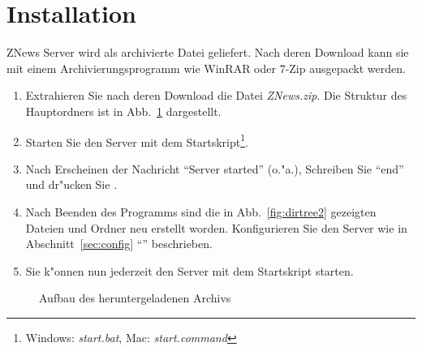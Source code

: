 \documentclass[12pt]{article}
\providecommand\meta[1]{\textlangle{\itshape #1\/}\textrangle}
\begin{document}
\begin{titlepage}

        \vfill

    \end{titlepage}



    \newpage
    \tableofcontents
    \newpage

    \section{Installation}

    ZNews Server wird als archivierte Datei geliefert.
    Nach deren Download kann sie mit einem Archivierungsprogramm
    wie WinRAR oder 7-Zip ausgepackt werden.

    \begin{enumerate}
        \item Extrahieren Sie nach deren Download die Datei \emph{ZNews.zip}.
        Die Struktur des Hauptordners ist in Abb.~\ref{fig:dirtree1} dargestellt.
        \item Starten Sie den Server mit dem Startskript\footnote{%
        Windows: \emph{start.bat}, Mac: \emph{start.command}}.
        \item Nach Erscheinen der Nachricht ``Server started'' (o."a.),
        Schreiben Sie ``end'' und dr"ucken Sie \meta{Enter}.
        \item Nach Beenden des Programms sind die in Abb.~\ref{fig:dirtree2}
        gezeigten Dateien und Ordner neu erstellt worden.
        Konfigurieren Sie den Server wie in Abschnitt~\ref{sec:config} ``'' beschrieben.
        \item Sie k"onnen nun jederzeit den Server mit dem Startskript starten.
    \end{enumerate}

    \begin{figure}[htb]
        \caption{\label{fig:dirtree1}Aufbau des heruntergeladenen Archivs}
    \end{figure}
\end{document}

